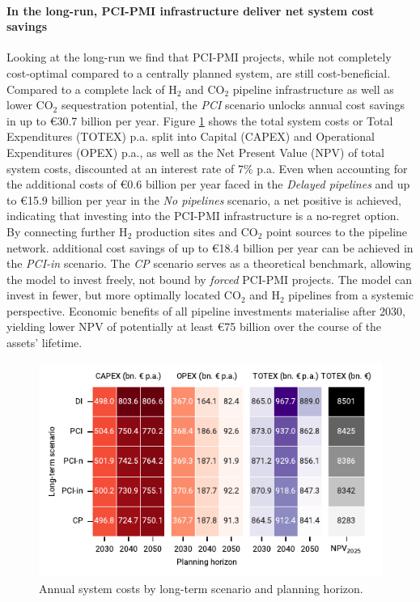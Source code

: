 \documentclass[pdflatex,sn-nature]{sn-jnl}%
\theoremstyle{thmstyleone}%
\theoremstyle{thmstyletwo}%
\theoremstyle{thmstylethree}%
\begin{document}
\paragraph{In the long-run, PCI-PMI infrastructure deliver net system cost savings}
Looking at the long-run we find that PCI-PMI projects, while not completely cost-optimal compared to a centrally planned system, are still cost-beneficial. Compared to a complete lack of H$_2$ and CO$_2$ pipeline infrastructure as well as lower CO$_2$ sequestration potential, the \textit{PCI} scenario unlocks annual cost savings in up to €30.7 billion per year. Figure \ref{fig:totex_heatmap} shows the total system costs or Total Expenditures (TOTEX) p.a. split into Capital (CAPEX) and Operational Expenditures (OPEX) p.a., as well as the Net Present Value (NPV) of total system costs, discounted at an interest rate of 7\% p.a.
Even when accounting for the additional costs of €0.6 billion per year faced in the \textit{Delayed pipelines} and up to €15.9 billion per year in the \textit{No pipelines} scenario, a net positive is achieved, indicating that investing into the PCI-PMI infrastructure is a no-regret option. By connecting further H$_2$ production sites and CO$_2$ point sources to the pipeline network. additional cost savings of up to €18.4 billion per year can be achieved in the \textit{PCI-in} scenario. The \textit{CP} scenario serves as a theoretical benchmark, allowing the model to invest freely, not bound by \textit{forced} PCI-PMI projects. The model can invest in fewer, but more optimally located CO$_2$ and H$_2$ pipelines from a systemic perspective. Economic benefits of all pipeline investments materialise after 2030, yielding lower NPV of potentially at least €75 billion over the course of the assets' lifetime. 

\begin{figure}[t]
  \centering
  \includegraphics{figures/totex_heatmap}
  \caption{Annual system costs by long-term scenario and planning horizon.}
  \label{fig:totex_heatmap}
\end{figure}
\end{document}
